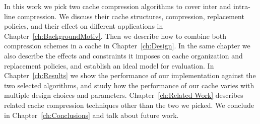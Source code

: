 In this work we pick two cache compression algorithms to cover inter and intra-line compression. We discuss their cache structures, compression, replacement policies, and their effect on different applications in Chapter~\ref{ch:BackgroundMotiv}. Then we describe how to combine both compression schemes in a cache in Chapter~\ref{ch:Design}. In the same chapter we also describe the effects and constraints it imposes on cache organization and replacement policies, and establish an ideal model for evaluation. In Chapter~\ref{ch:Results} we show the performance of our implementation against the two selected algorithms, and study how the performance of our cache varies with multiple design choices and parameters. Chapter~\ref{ch:Related Work} describes related cache compression techniques other than the two we picked. We conclude in Chapter~\ref{ch:Conclusions} and talk about future work.